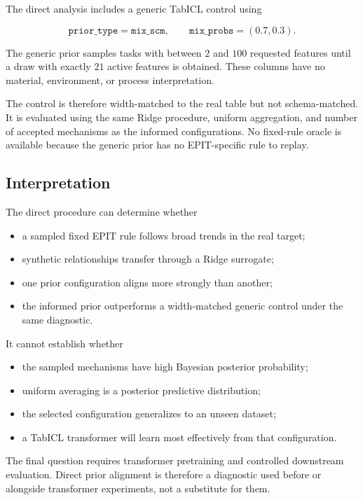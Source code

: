 \documentclass{article}
\begin{document}
The direct analysis includes a generic TabICL control using

\[
\texttt{prior\_type}
=
\texttt{mix\_scm},
\qquad
\texttt{mix\_probs}
=
(0.7,0.3).
\]

The generic prior samples tasks with between \(2\) and \(100\) requested features until a draw with exactly \(21\) active features is obtained. These columns have no material, environment, or process interpretation.

The control is therefore width-matched to the real table but not schema-matched. It is evaluated using the same Ridge procedure, uniform aggregation, and number of accepted mechanisms as the informed configurations. No fixed-rule oracle is available because the generic prior has no EPIT-specific rule to replay.

\subsection{Interpretation}

The direct procedure can determine whether

\begin{itemize}
    \item a sampled fixed EPIT rule follows broad trends in the real target;
    \item synthetic relationships transfer through a Ridge surrogate;
    \item one prior configuration aligns more strongly than another;
    \item the informed prior outperforms a width-matched generic control under the same diagnostic.
\end{itemize}

It cannot establish whether

\begin{itemize}
    \item the sampled mechanisms have high Bayesian posterior probability;
    \item uniform averaging is a posterior predictive distribution;
    \item the selected configuration generalizes to an unseen dataset;
    \item a TabICL transformer will learn most effectively from that configuration.
\end{itemize}

The final question requires transformer pretraining and controlled downstream evaluation. Direct prior alignment is therefore a diagnostic used before or alongside transformer experiments, not a substitute for them.
\end{document}
